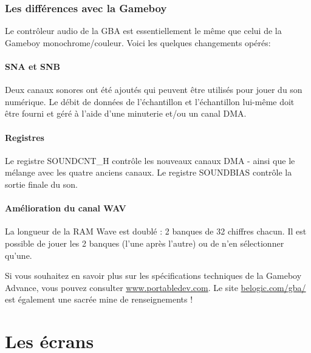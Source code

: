\documentclass[12pt,a4paper]{article}
\begin{document}

    \subsubsection{Les différences avec la Gameboy}

    Le contrôleur audio de la GBA est essentiellement le même que celui de la Gameboy monochrome/couleur.
    Voici les quelques changements opérés:

    \paragraph{SNA et SNB} Deux canaux sonores ont été ajoutés qui peuvent être utilisés pour jouer du son numérique.
                            Le débit de données de l'échantillon et l'échantillon lui-même doit être fourni et géré à l'aide d'une minuterie et/ou un canal DMA.

    \paragraph{Registres} Le registre SOUNDCNT\_H contrôle les nouveaux canaux DMA - ainsi que le mélange avec les quatre anciens canaux.
                            Le registre SOUNDBIAS contrôle la sortie finale du son.

    \paragraph{Amélioration du canal WAV} La longueur de la RAM Wave est doublé : 2 banques de 32 chiffres chacun.
                            Il est possible de jouer les 2 banques (l'une après l'autre) ou de n'en sélectionner qu'une.

    \medskip
    Si vous souhaitez en savoir plus sur les spécifications techniques de la Gameboy Advance,
    vous pouvez consulter \href{http://www.portabledev.com/media/GBA/tutoriels/gbatek.htm}{www.portabledev.com}.
    Le site \href{http://belogic.com/gba/}{belogic.com/gba/} est également une sacrée mine de renseignements !

    \newpage
    \section{Les écrans}
  
\end{document}
